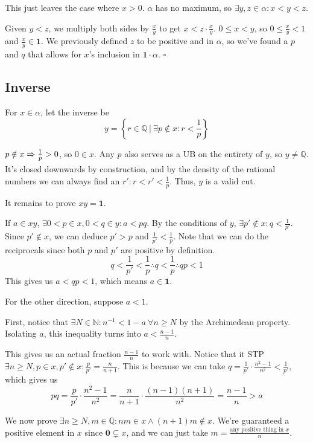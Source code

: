 \documentclass[12pt]{article}
\newcommand{\ra}{\xRightarrow}
\newcommand{\Q}{\mathbb{Q}}
\begin{document}
This just leaves the case where $x > 0$.
$\alpha$ has no maximum, so $\exists y, z \in \alpha: x < y < z$.

Given $y<z$, we multiply both sides by $\frac{x}{y}$ to get $x<z \cdot \frac{x}{y}$.
$0 \le x < y$, so $0 \le \frac{x}{y} < 1$ and $\frac{x}{y} \in \mathbf{1}$.
We previously defined $z$ to be positive and in $\alpha$, so
we've found a $p$ and $q$ that allows for $x$'s inclusion in $\mathbf{1} \cdot \alpha$. $\square$

\pagebreak

\subsection{Inverse}

For $x \in \alpha$, let the inverse be
\[y=\left\{r \in \Q\ \Big|\ \exists p \notin x: r < \frac{1}{p}\right\}\]

$p \notin x \ra{} \frac{1}{p} > 0$, so $0 \in x$.
Any $p$ also serves as a UB on the entirety of $y$, so $y \ne \Q$.
It's closed downwards by construction, and by the density of the rational
numbers we can always find an $r': r < r' < \frac{1}{p}$.
Thus, $y$ is a valid cut.

It remains to prove $xy=\mathbf{1}$.

If $a \in xy$, $\exists 0 < p \in x, 0 < q \in y: a < pq$.
By the conditions of $y$, $\exists p' \notin x: q < \frac{1}{p'}$.
Since $p' \notin x$, we can deduce $p' > p$ and $\frac{1}{p'} < \frac{1}{p}$.
Note that we can do the reciprocals since both $p$ and $p'$ are positive
by definition.
\[q < \frac{1}{p'} < \frac{1}{p} \therefore q < \frac{1}{p} \therefore qp < 1\]
This gives us $a < qp < 1$, which means $a \in \mathbf{1}$.

For the other direction, suppose $a < 1$.

First, notice that $\exists N \in \mathbb{N}: n^{-1}<1-a\ \forall n \ge N$
by the Archimedean property.
Isolating $a$, this inequality turns into $a < \frac{n-1}{n}$.

This gives us an actual fraction $\frac{n-1}{n}$ to work with.
Notice that it STP $\exists n \ge N, p \in x, p' \notin x: \frac{p}{p'}=\frac{n}{n+1}$.
This is because we can take $q=\frac{1}{p'} \cdot \frac{n^2-1}{n^2}<\frac{1}{p'}$, which gives us
\[pq=\frac{p}{p'} \cdot \frac{n^2-1}{n^2}=\frac{n}{n+1} \cdot \frac{(n-1)(n+1)}{n^2}=\frac{n-1}{n} > a\]

We now prove $\exists n \ge N, m \in \Q: nm \in x \land (n+1)m \notin x$.
We're guaranteed a positive element in $x$ since $\mathbf{0} \subsetneq x$,
and we can just take $m=\frac{\text{any positive thing in $x$}}{n}$.
\end{document}
